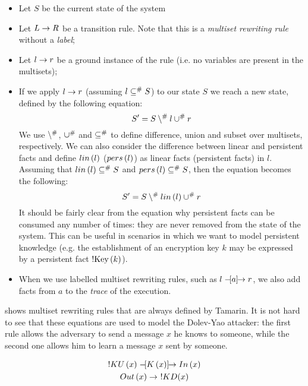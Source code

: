 \begin{itemize}
    \item{Let $S$ be the current state of the system}
    \item{Let $L \rightarrow R$ be a transition rule. Note that this is a \textit{multiset rewriting rule} without a \textit{label};}
    \item{Let $l \rightarrow r$ be a ground instance of the rule (i.e. no variables are present in the multisets);}
    \item{If we apply $l \rightarrow r$ (assuming $l \subseteq^\# S$) to our state $S$ we reach a new state, defined by the following equation:
    \begin{equation}
        S' = S \setminus^\# l \cup^\# r
    \end{equation}
    We use $\setminus^\#$, $\cup^\#$ and $\subseteq^\#$ to define difference, union and subset over multisets, respectively. We can also consider the difference between linear and persistent facts and define $lin\left(l\right)$ ($pers\left(l\right)$) as linear facts (persistent facts) in $l$. Assuming that $lin\left(l\right) \subseteq^\# S$ and $pers\left(l\right) \subseteq^\# S$, then the equation becomes the following:
    \begin{equation}
        S' = S \setminus^\# lin\left(l\right) \cup^\# r
    \end{equation}
    It should be fairly clear from the equation why persistent facts can be consumed any number of times: they are never removed from the state of the system. This can be useful in scenarios in which we want to model persistent knowledge (e.g. the establishment of an encryption key $k$ may be expressed by a persistent fact $\mbox{!Key}\left(k\right)$).
    }
    \item{When we use labelled multiset rewriting rules, such as $l \mathrel{-\hspace{-2pt}[a]\hspace{-4pt}\to} r$, we also add facts from $a$ to the \textit{trace} of the execution.}
\end{itemize}

 shows multiset rewriting rules that are always defined by Tamarin. It is not hard to see that these equations are used to model the Dolev-Yao attacker: the first rule allows the adversary to send a message $x$ he knows to someone, while the second one allows him to learn a message $x$ sent by someone.

\begin{equation}
\label{builtin-tamarin-msr-rules}
\begin{gathered}
    !KU\left(x\right) \mathrel{-\hspace{-2pt}[K\left(x\right)]\hspace{-4pt}\to} In\left(x\right)\\
    Out\left(x\right) \rightarrow \ !KD(x)
\end{gathered}
\end{equation}


